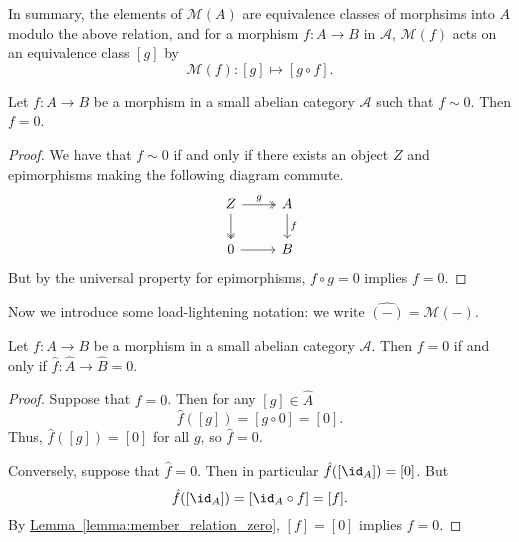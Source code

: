 \documentclass[main.tex]{subfiles}
\begin{document}
In summary, the elements of $\mathcal{M}(A)$ are equivalence classes of morphsims into $A$ modulo the above relation, and for a morphism $f\colon A \to B$ in $\mathcal{A}$, $\mathcal{M}(f)$ acts on an equivalence class $[g]$ by
\begin{equation*}
  \mathcal{M}(f)\colon [g] \mapsto [g \circ f].
\end{equation*}

\begin{lemma}
  \label{lemma:member_relation_zero}
  Let $f\colon A \to B$ be a morphism in a small abelian category $\mathcal{A}$ such that $f \sim 0$. Then $f = 0$.
\end{lemma}
\begin{proof}
  We have that $f \sim 0$ if and only if there exists an object $Z$ and epimorphisms making the following diagram commute.
  \begin{equation*}
    \begin{tikzcd}
      Z
      \arrow[r, twoheadrightarrow, "g"]
      \arrow[d, twoheadrightarrow]
      & A
      \arrow[d, "f"]
      \\
      0
      \arrow[r]
      & B
    \end{tikzcd}
  \end{equation*}
  But by the universal property for epimorphisms, $f \circ g = 0$ implies $f = 0$.
\end{proof}

Now we introduce some load-lightening notation: we write $\hat{(-)} = \mathcal{M}(-)$.

\begin{lemma}
  \label{lemma:member_embedding_injective_on_zero}
  Let $f\colon A \to B$ be a morphism in a small abelian category $\mathcal{A}$. Then $f = 0$ if and only if $\hat{f}\colon \hat{A} \to \hat{B} = 0$.
\end{lemma}
\begin{proof}
  Suppose that $f = 0$. Then for any $[g] \in \hat{A}$
  \begin{equation*}
    \hat{f}([g]) = [g \circ 0] = [0].
  \end{equation*}
  Thus, $\hat{f}([g]) = [0]$ for all $g$, so $\hat{f} = 0$.

  Conversely, suppose that $\hat{f} = 0$. Then in particular $\hat{f}([\id_{A}]) = [0]$. But
  \begin{equation*}
    \hat{f}([\id_{A}]) = [\id_{A} \circ f] = [f].
  \end{equation*}
  By \hyperref[lemma:member_relation_zero]{Lemma~\ref*{lemma:member_relation_zero}}, $[f] = [0]$ implies $f = 0$.
\end{proof}
\end{document}
